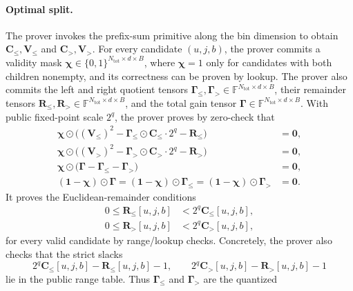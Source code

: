 \paragraph{Optimal split.}
The prover invokes the prefix-sum primitive along the bin dimension to obtain
$\mathbf{C}_{\leq},\mathbf{V}_{\leq}$ and
$\mathbf{C}_{>},\mathbf{V}_{>}$.
For every candidate $(u,j,b)$, the prover commits a validity mask
$\boldsymbol{\chi}\in\{0,1\}^{N_{\mathrm{tot}}\times d\times B}$, where
$\boldsymbol{\chi}=1$ only for candidates with both children nonempty, and its
correctness can be proven by lookup. The prover also commits the left and right
quotient tensors
$\boldsymbol{\Gamma}_{\leq},\boldsymbol{\Gamma}_{>}
\in\mathbb{F}^{N_{\mathrm{tot}}\times d\times B}$, their remainder tensors
$\mathbf{R}_{\leq},\mathbf{R}_{>}
\in\mathbb{F}^{N_{\mathrm{tot}}\times d\times B}$, and the total gain tensor
$\boldsymbol{\Gamma}\in\mathbb{F}^{N_{\mathrm{tot}}\times d\times B}$.
With public fixed-point scale $2^q$, the prover proves by zero-check that
\begin{align}
    \boldsymbol{\chi}\odot
    \bigl(
    (\mathbf{V}_{\leq})^2
    -\boldsymbol{\Gamma}_{\leq}\odot\mathbf{C}_{\leq}\cdot 2^q
    -\mathbf{R}_{\leq}
    \bigr)
    &=\mathbf{0},\\
    \boldsymbol{\chi}\odot
    \bigl(
    (\mathbf{V}_{>})^2
    -\boldsymbol{\Gamma}_{>}\odot\mathbf{C}_{>}\cdot 2^q
    -\mathbf{R}_{>}
    \bigr)
    &=\mathbf{0},\\
    \boldsymbol{\chi}\odot
    \bigl(
    \boldsymbol{\Gamma}
    -\boldsymbol{\Gamma}_{\leq}
    -\boldsymbol{\Gamma}_{>}
    \bigr)
    &=\mathbf{0},\\
    (\mathbf{1}-\boldsymbol{\chi})\odot\boldsymbol{\Gamma}
    =
    (\mathbf{1}-\boldsymbol{\chi})\odot\boldsymbol{\Gamma}_{\leq}
    =
    (\mathbf{1}-\boldsymbol{\chi})\odot\boldsymbol{\Gamma}_{>}
    &=
    \mathbf{0}.
\end{align}
It proves the Euclidean-remainder conditions
\begin{align}
    0\leq \mathbf{R}_{\leq}[u,j,b] &< 2^q\mathbf{C}_{\leq}[u,j,b],\\
    0\leq \mathbf{R}_{>}[u,j,b] &< 2^q\mathbf{C}_{>}[u,j,b],
\end{align}
for every valid candidate by range/lookup checks.  Concretely, the prover also
checks that the strict slacks
\[
2^q\mathbf{C}_{\leq}[u,j,b]-\mathbf{R}_{\leq}[u,j,b]-1,
\qquad
2^q\mathbf{C}_{>}[u,j,b]-\mathbf{R}_{>}[u,j,b]-1
\]
lie in the public range table. Thus
$\boldsymbol{\Gamma}_{\leq}$ and $\boldsymbol{\Gamma}_{>}$ are the quantized
